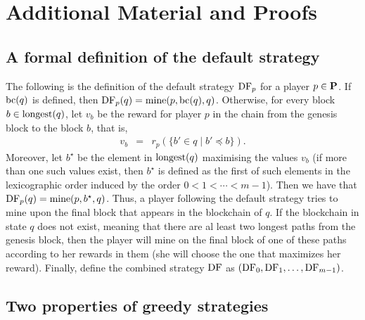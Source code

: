 
\section{Additional Material and Proofs}
\label{sec-appendix}

\subsection{A formal definition of the default strategy}
\label{sec-def-default}

The following is the definition of the default strategy $\text{\rm DF}_p$ for a player $p \in \mathbf{P}$. If $\text{bc}(q)$ is defined, then $\text{\rm DF}_p(q) = \text{\rm mine}(p,\text{bc}(q),q)$. Otherwise, for every block $b \in {\text{\rm longest}}(q)$, let $v_{b}$ be the reward for player $p$ in the chain from the genesis block to the block $b$, that is,
\begin{eqnarray*}
v_{b} & = & r_p(\{b' \in q \mid b' \preceq b\}).
\end{eqnarray*}
Moreover, let $b^\star$ be the element in ${\text{\rm longest}}(q)$ maximising the values $v_{b}$ (if more than one such values exist, then $b^\star$  is defined as the first of such elements in the lexicographic order induced by the order $0 < 1 < \cdots < m-1$). Then we have that $\text{\rm DF}_p(q) = \text{\rm mine}(p,b^\star,q)$.
Thus, a player following the default strategy tries to mine upon the final block that appears in the blockchain of $q$. If the blockchain in state $q$ does not exist, meaning that there are al least two longest paths from the genesis block, then the player will mine on the final block of one of these paths according to her rewards in them (she will choose the one that maximizes her reward). Finally, define the combined strategy $\text{\rm DF}$ as $(\text{\rm DF}_0,\text{\rm DF}_1,\dots,\text{\rm DF}_{m-1})$. 


\subsection{Two properties of greedy strategies}
\label{sec-char-states-greedy}

